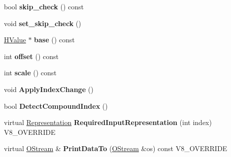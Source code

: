 \begin{DoxyCompactItemize}
\item 
\hypertarget{classv8_1_1internal_1_1_v8___f_i_n_a_l_aedccb8ae82479dacbbd838ce9c9ed604}{}bool {\bfseries skip\+\_\+check} () const \label{classv8_1_1internal_1_1_v8___f_i_n_a_l_aedccb8ae82479dacbbd838ce9c9ed604}

\item 
\hypertarget{classv8_1_1internal_1_1_v8___f_i_n_a_l_a28f7db376157f582b02db5a6bfa3423e}{}void {\bfseries set\+\_\+skip\+\_\+check} ()\label{classv8_1_1internal_1_1_v8___f_i_n_a_l_a28f7db376157f582b02db5a6bfa3423e}

\item 
\hypertarget{classv8_1_1internal_1_1_v8___f_i_n_a_l_abe28b7e3c19b7501428a4f55a8228530}{}\hyperlink{classv8_1_1internal_1_1_h_value}{H\+Value} $\ast$ {\bfseries base} () const \label{classv8_1_1internal_1_1_v8___f_i_n_a_l_abe28b7e3c19b7501428a4f55a8228530}

\item 
\hypertarget{classv8_1_1internal_1_1_v8___f_i_n_a_l_ac9d88f76bbd8a11f5cd8ecf5b0cb1844}{}int {\bfseries offset} () const \label{classv8_1_1internal_1_1_v8___f_i_n_a_l_ac9d88f76bbd8a11f5cd8ecf5b0cb1844}

\item 
\hypertarget{classv8_1_1internal_1_1_v8___f_i_n_a_l_a343324d232b79ac1656ce16efce9bc3b}{}int {\bfseries scale} () const \label{classv8_1_1internal_1_1_v8___f_i_n_a_l_a343324d232b79ac1656ce16efce9bc3b}

\item 
\hypertarget{classv8_1_1internal_1_1_v8___f_i_n_a_l_a096a2762336c9928e6f5065e7e63f3d9}{}void {\bfseries Apply\+Index\+Change} ()\label{classv8_1_1internal_1_1_v8___f_i_n_a_l_a096a2762336c9928e6f5065e7e63f3d9}

\item 
\hypertarget{classv8_1_1internal_1_1_v8___f_i_n_a_l_a2de65fde79232a2e33306c9937829e93}{}bool {\bfseries Detect\+Compound\+Index} ()\label{classv8_1_1internal_1_1_v8___f_i_n_a_l_a2de65fde79232a2e33306c9937829e93}

\item 
\hypertarget{classv8_1_1internal_1_1_v8___f_i_n_a_l_a6c6d1f37f40b113d8f4062f1ffff7215}{}virtual \hyperlink{classv8_1_1internal_1_1_representation}{Representation} {\bfseries Required\+Input\+Representation} (int index) V8\+\_\+\+O\+V\+E\+R\+R\+I\+D\+E\label{classv8_1_1internal_1_1_v8___f_i_n_a_l_a6c6d1f37f40b113d8f4062f1ffff7215}

\item 
\hypertarget{classv8_1_1internal_1_1_v8___f_i_n_a_l_ac450dad970b14246be761ccf5004924b}{}virtual \hyperlink{classv8_1_1internal_1_1_o_stream}{O\+Stream} \& {\bfseries Print\+Data\+To} (\hyperlink{classv8_1_1internal_1_1_o_stream}{O\+Stream} \&os) const V8\+\_\+\+O\+V\+E\+R\+R\+I\+D\+E\label{classv8_1_1internal_1_1_v8___f_i_n_a_l_ac450dad970b14246be761ccf5004924b}


\end{DoxyCompactItemize}
